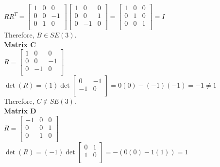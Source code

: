 \documentclass[12pt,letterpaper]{article}
\begin{document}
\begin{enumerate}[leftmargin=*]
$R R^{T} = 
\begin{bmatrix} 1 & 0 & 0\\ 0 & 0 & -1\\ 0 & 1 & 0\\ \end{bmatrix} 
\begin{bmatrix} 1 & 0 & 0\\ 0 & 0 & 1\\ 0 & -1 & 0\\ \end{bmatrix}
= \begin{bmatrix} 1 & 0 & 0\\ 0 & 1 & 0\\ 0 & 0 & 1\\ \end{bmatrix}
=I$\\

Therefore, $B \in SE(3)$.\\

\textbf{Matrix C}\\

$R = \begin{bmatrix} 1 & 0 & 0\\ 0 & 0 & -1\\ 0 & -1 & 0\\ \end{bmatrix}$\\

$\det(R) = (1) \det \begin{bmatrix} 0 & -1\\ -1 & 0\\ \end{bmatrix} = 0(0)-(-1)(-1) = -1 \neq 1$\\

Therefore, $C \notin SE(3)$.\\

\textbf{Matrix D}\\

$R = \begin{bmatrix} -1 & 0 & 0\\ 0 & 0 & 1\\ 0 & 1 & 0\\ \end{bmatrix}$\\

$\det(R) = (-1) \det \begin{bmatrix} 0 & 1\\ 1 & 0\\ \end{bmatrix} = -(0(0)-1(1)) = 1$\\


\end{enumerate}
\end{document}
